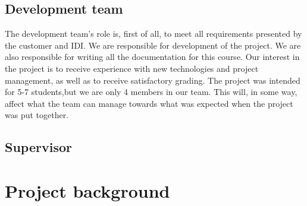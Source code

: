\subsection{Development team}
 The development team's role is, first of all, to meet all requirements presented by the customer and IDI. We are responsible for development of the project. We are also responsible for writing all the documentation for this course.  Our interest in the project is to receive experience with new technologies and project management, as well as to receive satisfactory grading. The project was intended for 5-7 students,but we are only 4 members in our team. This will, in some way, affect what the team can manage towards what was expected when the project was put together.

\subsection{Supervisor}


\section{Project background}

 
